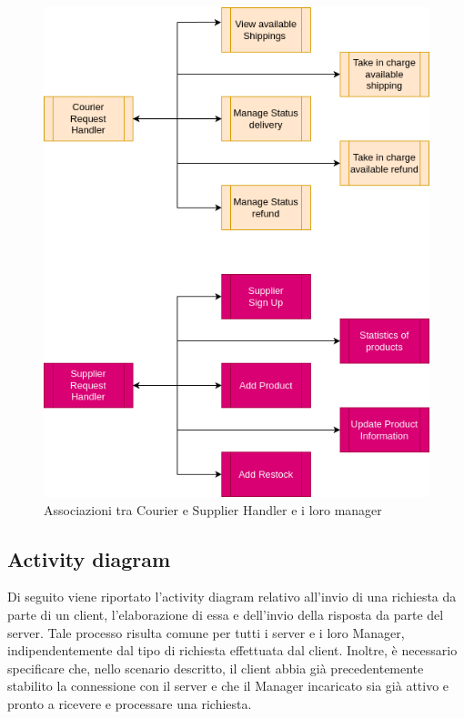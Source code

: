 \documentclass[12pt]{report}
\begin{document}
    \begin{figure}[H]
        \centering
        \includegraphics[scale=0.6]{images/System Architecture 2.png}
        \caption{Associazioni tra Courier e Supplier Handler e i loro manager}
        \label{fig:Manager_architecture_2}
    \end{figure}

    \newpage
    
    \subsection{Activity diagram}

    Di seguito viene riportato l'activity diagram relativo all'invio di una richiesta da parte di un client, l'elaborazione di essa e dell'invio della risposta da parte del server. Tale processo risulta comune per tutti i server e i loro Manager, indipendentemente dal tipo di richiesta effettuata dal client. Inoltre, è necessario specificare che, nello scenario descritto, il client abbia già precedentemente stabilito la connessione con il server e che il Manager incaricato sia già attivo e pronto a ricevere e processare una richiesta.
    
\end{document}
